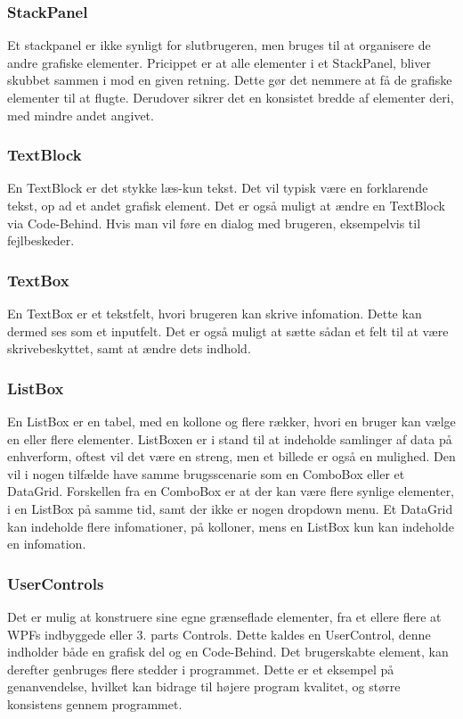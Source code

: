 \subsubsection*{StackPanel}
Et stackpanel er ikke synligt for slutbrugeren, men bruges til at organisere de andre grafiske elementer.
Pricippet er at alle elementer i et StackPanel, bliver skubbet sammen i mod en given retning.
Dette gør det nemmere at få de grafiske elementer til at flugte.
Derudover sikrer det en konsistet bredde af elementer deri, med mindre andet angivet.

\subsubsection*{TextBlock}
En TextBlock er det stykke læs-kun tekst.
Det vil typisk være en forklarende tekst, op ad et andet grafisk element.
Det er også muligt at ændre en TextBlock via Code-Behind. 
Hvis man vil føre en dialog med brugeren, eksempelvis til fejlbeskeder.

\subsubsection*{TextBox}
En TextBox er et tekstfelt, hvori brugeren kan skrive infomation. 
Dette kan dermed ses som et inputfelt. 
Det er også muligt at sætte sådan et felt til at være skrivebeskyttet, samt at ændre dets indhold.

\subsubsection*{ListBox}
En ListBox er en tabel, med en kollone og flere rækker, hvori en bruger kan vælge en eller flere elementer.
ListBoxen er i stand til at indeholde samlinger af data på enhverform, oftest vil det være en streng, men et billede er også en mulighed.
Den vil i nogen tilfælde have samme brugsscenarie som en ComboBox eller et DataGrid. 
Forskellen fra en ComboBox er at der kan være flere synlige elementer, i en ListBox på samme tid, samt der ikke er nogen dropdown menu.
Et DataGrid kan indeholde flere infomationer, på kolloner, mens en ListBox kun kan indeholde en infomation.

\subsubsection*{UserControls}
Det er mulig at konstruere sine egne grænseflade elementer, fra et ellere flere at WPFs indbyggede eller 3. parts Controls.
Dette kaldes en UserControl, denne indholder både en grafisk del og en Code-Behind.
Det brugerskabte element, kan derefter genbruges flere stedder i programmet.
Dette er et eksempel på genanvendelse, hvilket kan bidrage til højere program kvalitet, og større konsistens gennem programmet. 

\cbend